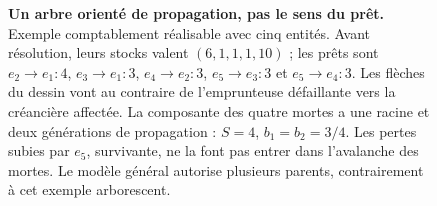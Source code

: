 \begin{figure}[htbp]\centering
{}
\caption{\textbf{Un arbre orienté de propagation, pas le sens du prêt.}
Exemple comptablement réalisable avec cinq entités. Avant résolution,
leurs stocks valent $(6,1,1,1,10)$ ; les prêts sont
$e_2\to e_1:4$, $e_3\to e_1:3$, $e_4\to e_2:3$,
$e_5\to e_3:3$ et $e_5\to e_4:3$.
Les flèches du dessin vont au contraire de l'emprunteuse défaillante vers
la créancière affectée. La composante des quatre mortes a une racine et
deux générations de propagation : $S=4$, $b_1=b_2=3/4$.
Les pertes subies par $e_5$, survivante, ne la font pas entrer dans
l'avalanche des mortes. Le modèle général autorise plusieurs parents,
contrairement à cet exemple arborescent.}
\label{fig:cascade}
\end{figure}
